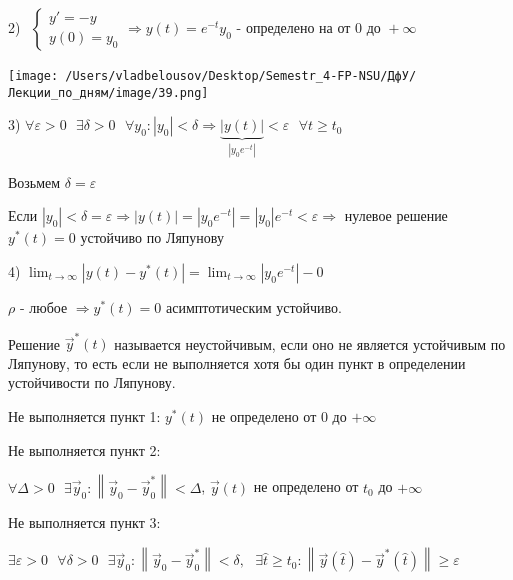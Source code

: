 \documentclass[12pt, a4paper]{report}
\begin{document}
2) \( \begin{aligned}
    \begin{cases}
        y ' = - y \\ 
        y(0 ) = y_0
    \end{cases}
    \Rightarrow y(t ) = e^{ - t } y_0 \text{ - определено на от } 0 \text{ до  }  + \infty  
\end{aligned} \) 

\begin{center}
    \texttt{[image: /Users/vladbelousov/Desktop/Semestr\_4-FP-NSU/ДфУ/Лекции\_по\_дням/image/39.png]}
\end{center}

3) \( \forall  \varepsilon > 0 \text{ }  \exists  \delta > 0 \text{ }  \forall  y_0 : \left\lvert y_0  \right\rvert< \delta \Rightarrow \underbrace{\left\lvert y (t) \right\rvert}_{\left\lvert y_0 e^{ - t}  \right\rvert} < \varepsilon \text{ }  \forall  t \ge t_0 \) 

Возьмем \( \delta = \varepsilon  \) 

Если \( \left\lvert y_0      \right\rvert < \delta = \varepsilon \Rightarrow \left\lvert y(t ) \right\rvert = \left\lvert y_0 e^{ - t }  \right\rvert = \left\lvert y_0  \right\rvert e^{ -t } < \varepsilon  \Rightarrow \) нулевое решение \( y^* (t )   = 0\) устойчиво по Ляпунову

4) \( \displaystyle  \lim_{t  \to \infty} \left\lvert y(t) - y^* (t )  \right\rvert = \lim_{t  \to \infty}  \left\lvert y_0 e^{- t }  \right\rvert - 0\) 

\( \rho \) - любое \( \Rightarrow y^* (t ) =0\)   асимптотическим устойчиво. 

\begin{definition}
    Решение \( \vec{y } ^* (t )  \) называется неустойчивым, если оно не является устойчивым по Ляпунову, то есть если не выполняется хотя бы один пункт в определении устойчивости по Ляпунову.
\end{definition}

Не выполняется пункт 1: \( y^* (t ) \) не определено от \( 0 \) до \( + \infty  \) 

Не выполняется пункт 2: 

\( \forall  \Delta > 0 \text{ }  \exists  \vec{y } _0 : \left\lVert \vec{y}  _0 - \vec{y } ^* _0  \right\rVert < \Delta  \), \( \vec{y } (t ) \) не определено от \( t_0 \) до \( + \infty  \) 

Не выполняется пункт 3: 

\( \exists \varepsilon > 0 \text{ }  \forall  \delta > 0 \text{ }  \exists  \vec{y } _0 : \left\lVert  \vec{y }  _0 - \vec{y } _ 0 ^*  \right\rVert < \delta , \text{ }  \exists  \hat{t }  \ge t_0 : \left\lVert \vec{y } (\hat{ t } )- \vec{y } ^*    (\hat{ t } )  \right\rVert \ge \varepsilon  \) 
\end{document}
